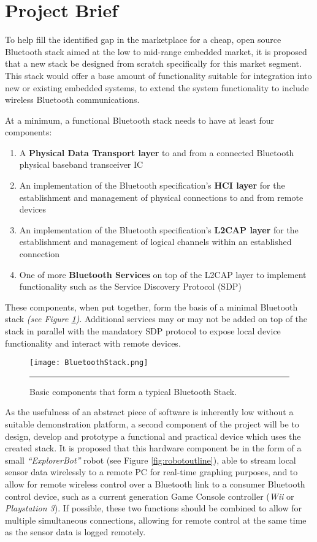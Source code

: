 \section{Project Brief}

To help fill the identified gap in the marketplace for a cheap, open source Bluetooth stack aimed at the low to mid-range embedded market, it is proposed that a new stack be designed from scratch specifically for this market segment. This stack would offer a base amount of functionality suitable for integration into new or existing embedded systems, to extend the system functionality to include wireless Bluetooth communications.

At a minimum, a functional Bluetooth stack needs to have at least four components:

\begin{enumerate}
	\item A \textbf{Physical Data Transport layer} to and from a connected Bluetooth physical baseband transceiver IC
	\item An implementation of the Bluetooth specification's \textbf{HCI layer} for the establishment and management of physical connections to and from remote devices
	\item An implementation of the Bluetooth specification's \textbf{L2CAP layer} for the establishment and management of logical channels within an established connection
	\item One of more \textbf{Bluetooth Services} on top of the L2CAP layer to implement functionality such as the Service Discovery Protocol (SDP)
\end{enumerate}

These components, when put together, form the basis of a minimal Bluetooth stack \emph{(see Figure \ref{fig:btstack})}. Additional services may or may not be added on top of the stack in parallel with the mandatory SDP protocol to expose local device functionality and interact with remote devices.

\begin{figure}[H]
	\centering
		\texttt{[image: BluetoothStack.png]}
	\rule{35em}{0.5pt}
	\caption[Typical Bluetooth stack components]{Basic components that form a typical Bluetooth Stack.}
	\label{fig:btstack}
\end{figure}

As the usefulness of an abstract piece of software is inherently low without a suitable demonstration platform, a second component of the project will be to design, develop and prototype a functional and practical device which uses the created stack. It is proposed that this hardware component be in the form of a small \textit{``ExplorerBot''} robot (see Figure \ref{fig:robotoutline}), able to stream local sensor data wirelessly to a remote PC for real-time graphing purposes, and to allow for remote wireless control over a Bluetooth link to a consumer Bluetooth control device, such as a current generation Game Console controller (\textit{Wii} or \textit{Playstation 3}). If possible, these two functions should be combined to allow for multiple simultaneous connections, allowing for remote control at the same time as the sensor data is logged remotely.

